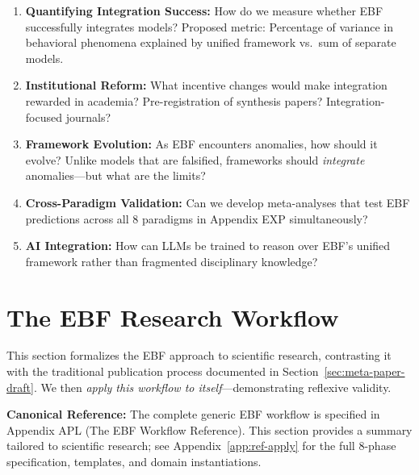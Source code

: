 \begin{enumerate}
    \item \textbf{Quantifying Integration Success:}
    How do we measure whether EBF successfully integrates models? Proposed metric:
    Percentage of variance in behavioral phenomena explained by unified framework vs.\
    sum of separate models.

    \item \textbf{Institutional Reform:}
    What incentive changes would make integration rewarded in academia? Pre-registration
    of synthesis papers? Integration-focused journals?

    \item \textbf{Framework Evolution:}
    As EBF encounters anomalies, how should it evolve? Unlike models that are falsified,
    frameworks should \textit{integrate} anomalies—but what are the limits?

    \item \textbf{Cross-Paradigm Validation:}
    Can we develop meta-analyses that test EBF predictions across all 8 paradigms in
    Appendix EXP simultaneously?

    \item \textbf{AI Integration:}
    How can LLMs be trained to reason over EBF's unified framework rather than
    fragmented disciplinary knowledge?
\end{enumerate}



\section{The EBF Research Workflow}
\label{sec:meta-ebf-workflow}

This section formalizes the EBF approach to scientific research, contrasting it with
the traditional publication process documented in Section~\ref{sec:meta-paper-draft}.
We then \textit{apply this workflow to itself}---demonstrating reflexive validity.

\textbf{Canonical Reference:} The complete generic EBF workflow is specified in
Appendix APL (The EBF Workflow Reference). This section provides
a summary tailored to scientific research; see Appendix~\ref{app:ref-apply} for
the full 8-phase specification, templates, and domain instantiations.

